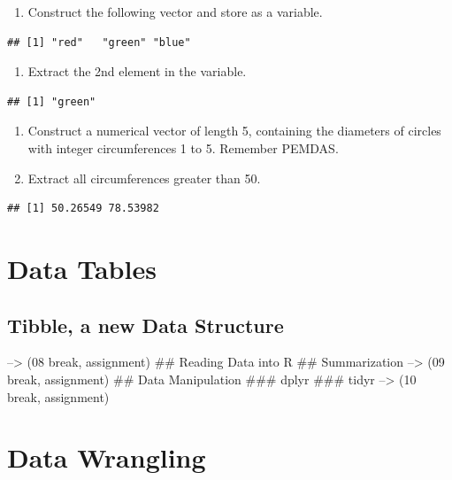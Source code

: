 \documentclass[
]{book}
\providecommand{\tightlist}{%
  \setlength{\itemsep}{0pt}\setlength{\parskip}{0pt}}
\begin{document}
\begin{enumerate}
\def\labelenumi{\arabic{enumi}.}
\tightlist
\item
  Construct the following vector and store as a variable.
\end{enumerate}

\begin{verbatim}
## [1] "red"   "green" "blue"
\end{verbatim}

\begin{enumerate}
\def\labelenumi{\arabic{enumi}.}
\setcounter{enumi}{1}
\tightlist
\item
  Extract the 2nd element in the variable.
\end{enumerate}

\begin{verbatim}
## [1] "green"
\end{verbatim}

\begin{enumerate}
\def\labelenumi{\arabic{enumi}.}
\setcounter{enumi}{2}
\item
  Construct a numerical vector of length 5, containing the diameters of circles with integer circumferences 1 to 5. Remember PEMDAS.
\item
  Extract all circumferences greater than 50.
\end{enumerate}

\begin{verbatim}
## [1] 50.26549 78.53982
\end{verbatim}

\hypertarget{data-tables}{%
\chapter{Data Tables}\label{data-tables}}

\hypertarget{tibble-a-new-data-structure}{%
\section{Tibble, a new Data Structure}\label{tibble-a-new-data-structure}}

--\textgreater{} (08 break, assignment)
\#\# Reading Data into R
\#\# Summarization
--\textgreater{} (09 break, assignment)
\#\# Data Manipulation
\#\#\# dplyr
\#\#\# tidyr
--\textgreater{} (10 break, assignment)

\hypertarget{data-wrangling}{%
\chapter{Data Wrangling}\label{data-wrangling}}
\end{document}
